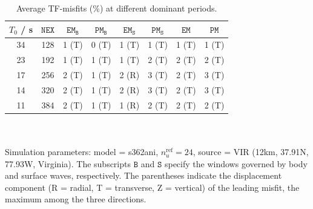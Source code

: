 \documentclass[extra]{gji}
\begin{document}
\begin{table}
\begin{minipage}{\columnwidth}
\caption{Average TF-misfits ($\%$) at different dominant periods.}
\label{tab:freq}
\setlength{\tabcolsep}{.28cm}
\begin{tabular*}{\textwidth}{cccccccc}
$T_0$ / s & $\mathtt{NEX}$ & $\mathtt{EM_B}$ & $\mathtt{PM_B}$ & 
$\mathtt{EM_S}$ & $\mathtt{PM_S}$ & $\mathtt{EM}$ & $\mathtt{PM}$\\[2pt]
\hline
34 & 128 &
1 {\scriptsize(T)}&
0 {\scriptsize(T)}&
1 {\scriptsize(T)}&
1 {\scriptsize(T)}&
1 {\scriptsize(T)}&
1 {\scriptsize(T)}\\[2pt]
23 & 192 &
1 {\scriptsize(T)}&
1 {\scriptsize(T)}&
1 {\scriptsize(T)}&
2 {\scriptsize(T)}&
2 {\scriptsize(T)}&
2 {\scriptsize(T)}\\[2pt]
17 & 256 &
2 {\scriptsize(T)}&
1 {\scriptsize(T)}&
2 {\scriptsize(R)}&
3 {\scriptsize(T)}&
2 {\scriptsize(T)}&
3 {\scriptsize(T)}\\[2pt]
14 & 320 &
2 {\scriptsize(T)}&
1 {\scriptsize(T)}&
2 {\scriptsize(R)}&
3 {\scriptsize(T)}&
2 {\scriptsize(T)}&
3 {\scriptsize(T)}\\[2pt]
11 & 384 & 
2 {\scriptsize(T)}&
1 {\scriptsize(T)}&
1 {\scriptsize(R)}&
2 {\scriptsize(T)}&
2 {\scriptsize(T)}&
2 {\scriptsize(T)}\\[2pt]
\hline
\end{tabular*}
\\\\
Simulation parameters: model = s362ani, $n_u^\text{ref}=24$, 
source = VIR (12km, 37.91\degr N, 77.93\degr W, Virginia).
The subscripts $\mathtt{B}$ and $\mathtt{S}$ specify the windows 
governed by body and surface waves, respectively.
The parentheses indicate the displacement component 
(R = radial, T = transverse, Z = vertical) of the leading misfit, 
the maximum among the three directions.
\end{minipage}
\end{table}
\end{document}
